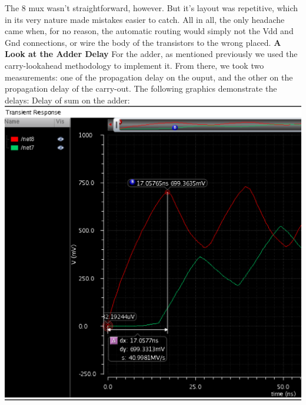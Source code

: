\documentclass[12pt]{article}
\begin{document}
  \newline \newline
  The 8 mux wasn't straightforward, however. But it's layout was repetitive, which in its very nature 
  made mistakes easier to catch.
  \newline \newline
  All in all, the only headache came when, for no reason, the automatic routing would simply not the
  Vdd and Gnd connections, or wire the body of the transistors to the wrong placed. 
  \newline \newline
	\textbf{A Look at the Adder Delay}
  \newline \newline
  For the adder, as mentioned previously we used the carry-lookahead methodology to implement it.
  From there, we took two measurements: one of the propagation delay on the ouput, and the other on
  the propagation delay of the carry-out. The following graphics demonstrate the delays:
  \newline \newline
  \newline \newline
  Delay of sum on the adder:
  \newline \newline
  \newline \newline
  \includegraphics[scale=0.4]{delaysum.png} \\
\end{document}
